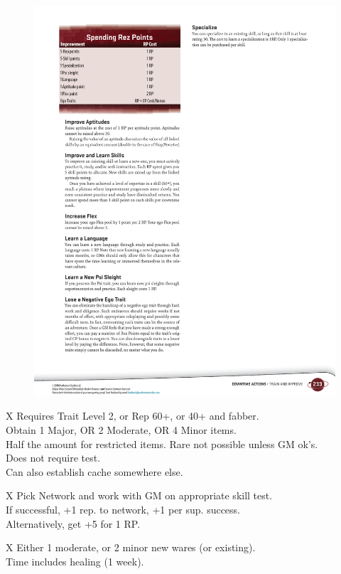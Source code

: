 \begin{figure}[h!]%
   \includegraphics[scale=0.9]{gfx/downtime-rez}%
\end{figure}%

\bigskip

\begin{eptable}{ X }
   Requires Trait Level \num{2}, or Rep \num{60}+, or  \num{40}+ and fabber.\\
   Obtain \num{1} Major, OR \num{2} Moderate, OR \num{4} Minor items.\\
   Half the amount for restricted items. Rare not possible unless GM ok's.\\
   Does not require test.\\
   Can also establish cache somewhere else.\\
\end{eptable}

\bigskip

\begin{eptable}{ X }
   Pick Network and work with GM on appropriate skill test.\\
   If successful, +1 rep. to network, +1 per sup. success.\\
   Alternatively, get +5 for 1 RP.\\
\end{eptable}


\bigskip

\begin{eptable}{ X }
   Either \num{1} moderate, or \num{2} minor new wares (or existing).\\
   Time includes healing (\num{1} week).\\
\end{eptable}
